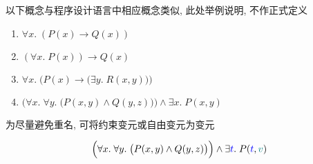 \begin{frame}{}
  \begin{center}
    以下概念与程序设计语言中相应概念类似, 此处举例说明, 不作正式定义
  \end{center}

  \begin{definition}
    \begin{enumerate}[(1)]
      \setlength{\itemsep}{6pt}
      \item $\forall x.\; (P(x) \to Q(x))$
      \item $(\forall x.\; P(x)) \to Q(x)$
      \item $\forall x.\; \Big(P(x) \to \big(\exists y.\; R(x, y)\big)\Big)$
      \item $\Big(\forall x.\; \forall y.\; \big(P(x, y) \land Q(y, z)\big)\Big) \land \exists x.\; P(x, y)$
    \end{enumerate}
  \end{definition}

  \pause
  \vspace{0.30cm}
  \begin{definition}[改名 (Rename)]
    为尽量避免重名, 可将约束变元或自由变元为变元
  \end{definition}

  \[
    \Big(\forall x.\; \forall y.\; \big(P(x, y) \land Q(y, z)\big)\Big)
      \land \exists \textcolor{blue}{t}.\; P(\textcolor{blue}{t}, \textcolor{teal}{v})
  \]
\end{frame}
